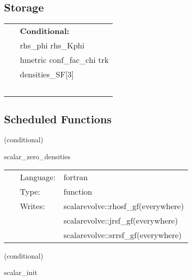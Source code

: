 \subsection*{Storage}

\hspace{5mm}

 \begin{tabular*}{160mm}{ll} 
~& {\bf Conditional:} \\ 
~ &  rhs\_phi rhs\_Kphi\\ 
~ &  hmetric conf\_fac\_chi trk\\ 
~ &  densities\_SF[3]\\ 
~ & ~\\ 
\end{tabular*} 


\subsection*{Scheduled Functions}
\vspace{5mm}

   (conditional) 

\hspace{5mm} scalar\_zero\_densities 

\hspace{5mm}{\it initialise the sf densities to zero } 


\hspace{5mm}

 \begin{tabular*}{160mm}{cll} 
~ & Language:  & fortran \\ 
~ & Type:  & function \\ 
~ & Writes:  & scalarevolve::rhosf\_gf(everywhere) \\ 
~& ~ &scalarevolve::jrsf\_gf(everywhere)\\ 
~& ~ &scalarevolve::srrsf\_gf(everywhere)\\ 
\end{tabular*} 


\vspace{5mm}

   (conditional) 

\hspace{5mm} scalar\_init 

\hspace{5mm}{\it initialise flags and boundary condition } 


\hspace{5mm}

